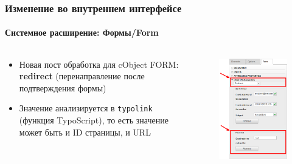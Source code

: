 \begin{frame}[fragile]
	\frametitle{Изменение во внутреннем интерфейсе}
	\framesubtitle{Системное расширение: Формы/Form}

		\begin{columns}[T]

    		\begin{column}{.5\textwidth}
				\begin{itemize}
					\item Новая пост обработка для cObject FORM: \textbf{redirect}\newline
						(перенаправление после подтверждения формы)
					\item Значение анализируется в \texttt{typolink} (функция TypoScript),\newline
						то есть значение может быть и ID страницы, и URL
				\end{itemize}
    		\end{column}

    		\begin{column}{.5\textwidth}
    			\begin{figure}\vspace*{-0.4cm}
    				\includegraphics[width=0.65\linewidth]{Images/BackendChanges/FormRedirectPostProcessor.png}
    			\end{figure}
    		\end{column}

    	\end{columns}

\end{frame}


